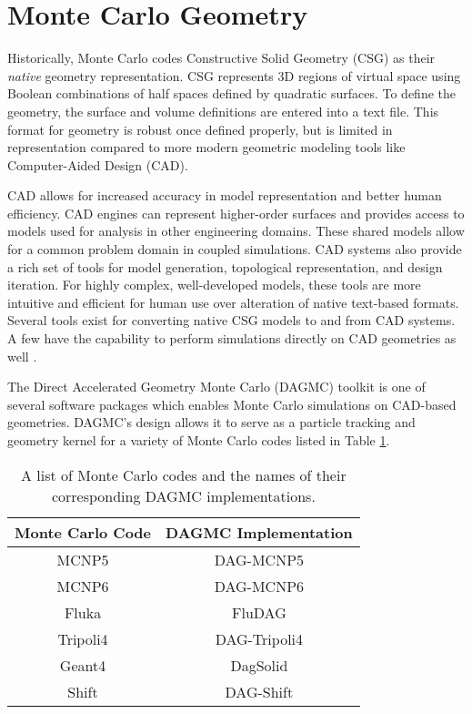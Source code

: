 \section{Monte Carlo Geometry}


Historically, Monte Carlo codes Constructive Solid Geometry (CSG) as their
\textit{native} geometry representation. CSG represents 3D regions of virtual
space using Boolean combinations of half spaces defined by quadratic
surfaces. To define the geometry, the surface and volume definitions are entered
into a text file. This format for geometry is robust once defined properly, but
is limited in representation compared to more modern geometric modeling tools
like Computer-Aided Design (CAD).

CAD allows for increased accuracy in model representation and better human
efficiency. CAD engines can represent higher-order surfaces and provides access
to models used for analysis in other engineering domains. These shared models
allow for a common problem domain in coupled simulations. CAD systems also
provide a rich set of tools for model generation, topological representation,
and design iteration. For highly complex, well-developed models, these tools are
more intuitive and efficient for human use over alteration of native text-based
formats. Several tools exist for converting native CSG models to and from CAD
systems. A few have the capability to perform simulations directly on CAD
geometries as well \cite{Leppanen_2015}.

The Direct Accelerated Geometry Monte Carlo (DAGMC) \cite{Tautges_2009} toolkit
is one of several software packages which enables Monte Carlo simulations on
CAD-based geometries. DAGMC's design allows it to serve as a particle tracking
and geometry kernel for a variety of Monte Carlo codes listed
in Table \ref{tab:dagmc_implementations}.

\begin{table}[H]
  \centering
  \begin{tabular}{c c}
    \hline
    Monte Carlo Code & DAGMC Implementation \\
    \hline
    MCNP5\cite{LANL_MCNP5_VOLIII}            & DAG-MCNP5            \\
    MCNP6\cite{Goorley_2016}                 & DAG-MCNP6            \\
    Fluka\cite{Bohlen_2014}                  & FluDAG               \\
    Tripoli4\cite{Malouch_2017}              & DAG-Tripoli4         \\
    Geant4\cite{GEANT4_2003}                 & DagSolid             \\
    Shift\cite{Pandya_2016}                  & DAG-Shift            \\
    \hline
  \end{tabular}
  \caption{A list of Monte Carlo codes and the names of their corresponding DAGMC implementations.}
  \label{tab:dagmc_implementations}
\end{table}


